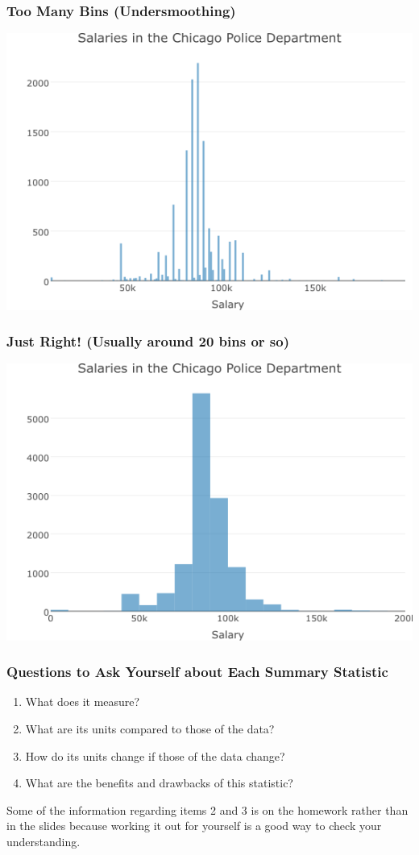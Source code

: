 \documentclass{beamer}
\begin{document}
\begin{frame}
\frametitle{Too Many Bins (Undersmoothing)}
	\includegraphics[width = \textwidth]{./images/histogramMany.png}
\end{frame}

\begin{frame}
\frametitle{Just Right! (Usually around 20 bins or so)}
	\includegraphics[width = \textwidth]{./images/histogramRight.png}
\end{frame}

\begin{frame}
\frametitle{Questions to Ask Yourself about Each Summary Statistic}
	\begin{enumerate}
		\item What does it measure?
		\item What are its units compared to those of the data?
		\item How do its units change if those of the data change?
		\item What are the benefits and drawbacks of this statistic?
	\end{enumerate}
	\vspace{2em}
	\alert{Some of the information regarding items 2 and 3 is on the homework rather than in the 		slides because working it out for yourself is a good way to check your understanding.}
\end{frame}
\end{document}
